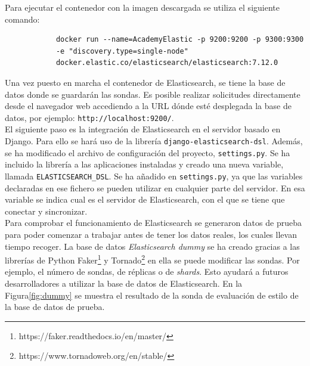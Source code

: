 Para ejecutar el contenedor con la imagen descargada se utiliza el siguiente comando:

{\footnotesize
		\begin{verbatim}
			docker run --name=AcademyElastic -p 9200:9200 -p 9300:9300
            -e "discovery.type=single-node" 
            docker.elastic.co/elasticsearch/elasticsearch:7.12.0
		\end{verbatim}
		}

  Una vez puesto en marcha el contenedor de Elasticsearch, se tiene la base de datos donde se guardarán las sondas. Es posible realizar solicitudes directamente desde el navegador web accediendo a la URL dónde esté desplegada la base de datos, por ejemplo: \texttt{http://localhost:9200/}.\\
  
   El siguiente paso es la integración de Elasticsearch en el servidor basado en Django. Para ello se hará uso de la librería \texttt{django-elasticsearch-dsl}. Además, se ha modificado el archivo de configuración del proyecto, \texttt{settings.py}. Se ha incluido la librería a las aplicaciones instaladas y creado una nueva variable, llamada \texttt{ELASTICSEARCH\_DSL}. Se ha añadido en \texttt{settings.py}, ya que las variables declaradas en ese fichero se pueden utilizar en cualquier parte del servidor. En esa variable se indica cual es el servidor de Elasticsearch, con el que se tiene que conectar y sincronizar.\\

Para comprobar el funcionamiento de Elasticsearch se generaron datos de prueba para poder comenzar a trabajar antes de tener los datos reales, los cuales llevan tiempo recoger. La base de datos \textit{Elasticsearch dummy} se ha creado gracias a las librerías de Python Faker\footnote{https://faker.readthedocs.io/en/master/} y Tornado\footnote{https://www.tornadoweb.org/en/stable/} en ella se puede modificar las sondas. Por ejemplo, el número de sondas, de réplicas o de \textit{shards}. Esto ayudará a futuros desarrolladores a utilizar la base de datos de Elasticsearch. En la Figura\ref{fig:dummy} se muestra el resultado de la sonda de evaluación de estilo de la base de datos de prueba.


